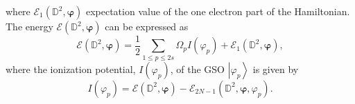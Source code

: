 \documentclass[aps,preprint]{revtex4}%
\begin{document}
where $\mathcal{E}_{1}\left(  \mathbb{D}^{2},\mathbf{\varphi}\right)  $
expectation value of the one electron part of the Hamiltonian. The energy
$\mathcal{E}\left(  \mathbb{D}^{2},\mathbf{\varphi}\right)  $ can be expressed
as
\begin{equation}
\mathcal{E}\left(  \mathbb{D}^{2},\mathbf{\varphi}\right)  =\frac{1}{2}%
\sum_{1\leq p\leq2s}\Omega_{p}I\left(  \varphi_{p}\right)  +\mathcal{E}%
_{1}\left(  \mathbb{D}^{2},\mathbf{\varphi}\right)  ,\label{TEexpec}%
\end{equation}
where the ionization potential, $I\left(  \varphi_{p}\right)  $, of the GSO
$\left\vert \varphi_{p}\right\rangle $ is given by
\begin{equation}
I\left(  \varphi_{p}\right)  =\mathcal{E}\left(  \mathbb{D}^{2}%
,\mathbf{\varphi}\right)  -\mathcal{E}_{2N-1}\left(  \mathbb{D}^{2}%
,\mathbf{\varphi},\varphi_{p}\right)  .
\end{equation}
\end{document}
